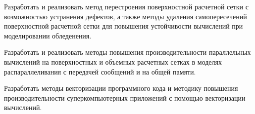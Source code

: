 \item Разработать и реализовать метод перестроения поверхностной расчетной сетки с возможностью устранения дефектов, а также методы удаления самопересечений поверхностной расчетной сетки для повышения устойчивости вычислений при моделировании обледенения.
\item Разработать и реализовать методы повышения производительности параллельных вычислений на поверхностных и объемных расчетных сетках в моделях распараллеливания с передачей сообщений и на общей памяти.
\item Разработать методы векторизации программного кода и методику повышения производительности суперкомпьютерных приложений с помощью векторизации вычислений.
